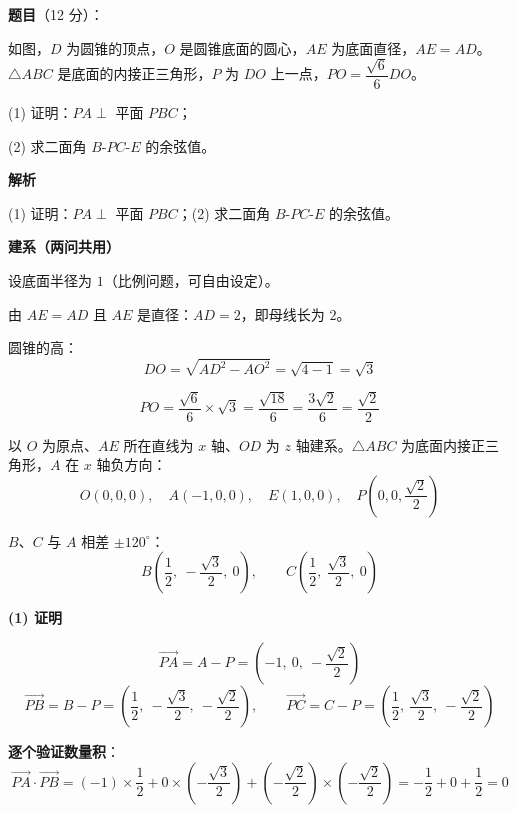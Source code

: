 \begin{answer}

\textbf{题目}（12 分）：

如图，$D$ 为圆锥的顶点，$O$ 是圆锥底面的圆心，$AE$ 为底面直径，$AE=AD$。$\triangle ABC$ 是底面的内接正三角形，$P$ 为 $DO$ 上一点，$PO=\dfrac{\sqrt6}6DO$。
\nopagebreak[4]
\begin{center}\end{center}
\nopagebreak[4]
  (1) 证明：$PA\perp$ 平面 $PBC$；

  (2) 求二面角 $B\text{-}PC\text{-}E$ 的余弦值。

\textbf{解析}

  (1) 证明：$PA\perp$ 平面 $PBC$；(2) 求二面角 $B\text{-}PC\text{-}E$ 的余弦值。

\par\medskip

\textbf{建系（两问共用）}

设底面半径为 $1$（比例问题，可自由设定）。

由 $AE=AD$ 且 $AE$ 是直径：$AD=2$，即母线长为 $2$。

圆锥的高：
\nopagebreak[4]
\[DO=\sqrt{AD^{2}-AO^{2}}=\sqrt{4-1}=\sqrt3\]

\nopagebreak[4]
\[PO=\frac{\sqrt6}6\times\sqrt3=\frac{\sqrt{18}}6=\frac{3\sqrt2}6=\frac{\sqrt2}2\]

以 $O$ 为原点、$AE$ 所在直线为 $x$ 轴、$OD$ 为 $z$ 轴建系。$\triangle ABC$ 为底面内接正三角形，$A$ 在 $x$ 轴负方向：
\nopagebreak[4]
\[O(0,0,0),\quad A(-1,0,0),\quad E(1,0,0),\quad P\left(0,0,\frac{\sqrt2}2\right)\]

$B$、$C$ 与 $A$ 相差 $\pm120^\circ$：
\nopagebreak[4]
\[B\left(\frac12,\ -\frac{\sqrt3}2,\ 0\right),\qquad C\left(\frac12,\ \frac{\sqrt3}2,\ 0\right)\]

\par\medskip

\textbf{(1) 证明}

\nopagebreak[4]
\[\overrightarrow{PA}=A-P=\left(-1,\ 0,\ -\frac{\sqrt2}2\right)\]
\nopagebreak[4]
\[\overrightarrow{PB}=B-P=\left(\frac12,\ -\frac{\sqrt3}2,\ -\frac{\sqrt2}2\right),\qquad \overrightarrow{PC}=C-P=\left(\frac12,\ \frac{\sqrt3}2,\ -\frac{\sqrt2}2\right)\]

\textbf{逐个验证数量积}：
\nopagebreak[4]
\[\overrightarrow{PA}\cdot\overrightarrow{PB}=(-1)\times\frac12+0\times\left(-\frac{\sqrt3}2\right)+\left(-\frac{\sqrt2}2\right)\times\left(-\frac{\sqrt2}2\right)=-\frac12+0+\frac12=0\]


\end{answer}
